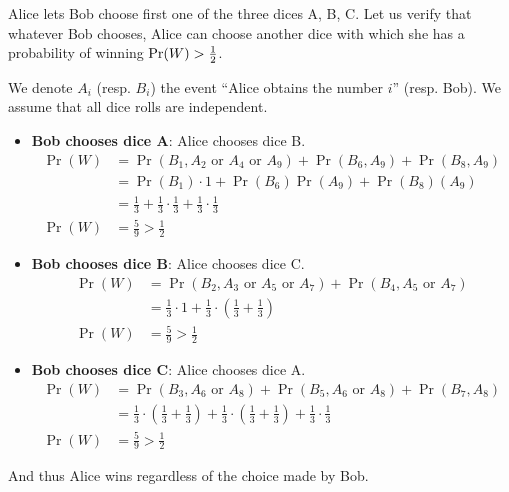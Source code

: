 \providecommand{\f}[2]{\ensuremath{\frac{#1}{#2}}}

Alice lets Bob choose first one of the three dices A, B, C. Let us verify that whatever Bob chooses, Alice can choose another dice with which she has a probability of winning $\Pr(W) > {1 \over 2}$.

We denote $A_i$ (resp. $B_i$) the event ``Alice obtains the number $i$'' (resp. Bob). We assume that all dice rolls are independent.

\begin{itemize}
  \item \textbf{Bob chooses dice A}: Alice chooses dice B.\\
  \[
    \begin{array}{ll}
      \Pr(W) & = \Pr(B_1, {A_2\text{ or }A_4\text{ or }A_9}) + \Pr(B_6, A_9) + \Pr(B_8, A_9) \\
             & = \Pr(B_1) \cdot 1 + \Pr(B_6)\Pr(A_9) + \Pr(B_8)(A_9) \\
             & = \f{1}{3} + \f{1}{3} \cdot \f{1}{3} + \f{1}{3} \cdot \f{1}{3} \\
      \Pr(W) & = \f{5}{9} > \f{1}{2}
    \end{array}
  \]

  \item \textbf{Bob chooses dice B}: Alice chooses dice C.\\
  \[
    \begin{array}{ll}
      \Pr(W) & = \Pr(B_2, {A_3\text{ or }A_5\text{ or }A_7}) + \Pr(B_4, {A_5\text{ or }A_7}) \\
             & = \f{1}{3} \cdot 1 + \f{1}{3} \cdot (\f{1}{3} + \f{1}{3}) \\
      \Pr(W) & = \f{5}{9} > \f{1}{2}
    \end{array}
  \]

  \item \textbf{Bob chooses dice C}: Alice chooses dice A.\\
  \[
    \begin{array}{ll}
      \Pr(W) & = \Pr(B_3, {A_6\text{ or }A_8}) + \Pr(B_5, {A_6\text{ or }A_8}) + \Pr(B_7, A_8) \\
             & = \f{1}{3} \cdot (\f{1}{3} + \f{1}{3}) + \f{1}{3} \cdot (\f{1}{3} + \f{1}{3}) + \f{1}{3} \cdot \f{1}{3} \\
      \Pr(W) & = \f{5}{9} > \f{1}{2}
    \end{array}
  \]
\end{itemize}

And thus Alice wins regardless of the choice made by Bob.

